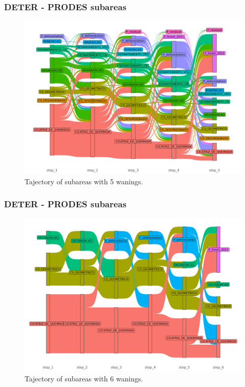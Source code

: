 \documentclass[aspectratio=169]{beamer}
\begin{document}
\begin{frame}
    \frametitle{DETER - PRODES subareas}
    \begin{figure}[h] 
        \includegraphics[width=0.65\linewidth]
        {./figures/plot_deter_prodes_subarea_trajectory_5.png}
        \caption{Tajectory of subareas with 5 wanings.}
        \label{fig:deter_prodes_subarea_trajectory_5}
    \end{figure}
\end{frame}

\begin{frame}
    \frametitle{DETER - PRODES subareas}
    \begin{figure}[h] 
        \includegraphics[width=0.65\linewidth]
        {./figures/plot_deter_prodes_subarea_trajectory_6.png}
        \caption{Tajectory of subareas with 6 wanings.}
        \label{fig:deter_prodes_subarea_trajectory_6}
    \end{figure}
\end{frame}


\end{document}
